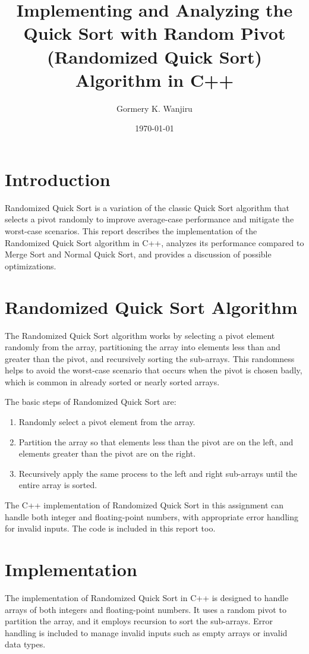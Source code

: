 \documentclass{article}
\title{Implementing and Analyzing the Quick Sort with Random Pivot (Randomized Quick Sort) Algorithm in C++}
\author{Gormery K. Wanjiru}
\date{\today}
\begin{document}
\maketitle

\section{Introduction}
Randomized Quick Sort is a variation of the classic Quick Sort algorithm that selects a pivot randomly to improve average-case performance and mitigate the worst-case scenarios. This report describes the implementation of the Randomized Quick Sort algorithm in C++, analyzes its performance compared to Merge Sort and Normal Quick Sort, and provides a discussion of possible optimizations.

\section{Randomized Quick Sort Algorithm}
The Randomized Quick Sort algorithm works by selecting a pivot element randomly from the array, partitioning the array into elements less than and greater than the pivot, and recursively sorting the sub-arrays. This randomness helps to avoid the worst-case scenario that occurs when the pivot is chosen badly, which is common in already sorted or nearly sorted arrays.

The basic steps of Randomized Quick Sort are:
\begin{enumerate}
    \item Randomly select a pivot element from the array.
    \item Partition the array so that elements less than the pivot are on the left, and elements greater than the pivot are on the right.
    \item Recursively apply the same process to the left and right sub-arrays until the entire array is sorted.
\end{enumerate}

The C++ implementation of Randomized Quick Sort in this assignment can handle both integer and floating-point numbers, with appropriate error handling for invalid inputs.
The code is included in this report too.

\section{Implementation}
The implementation of Randomized Quick Sort in C++ is designed to handle arrays of both integers and floating-point numbers. It uses a random pivot to partition the array, and it employs recursion to sort the sub-arrays. Error handling is included to manage invalid inputs such as empty arrays or invalid data types.
\end{document}
